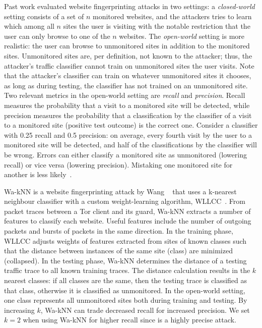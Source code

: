 Past work evaluated website fingerprinting attacks in two settings:
a {\em closed-world} setting consists of a set of $n$ {monitored}
websites, and the attackers tries to learn which among all $n$ sites the
user is visiting with the notable restriction that the user can only
browse to one of the $n$ websites.  The {\em open-world} setting is more
realistic: the user can browse to {unmonitored} sites in addition to the
monitored sites. Unmonitored sites are, per definition, not known to the
attacker; thus, the attacker's traffic classifier cannot train on unmonitored
sites the user visits. Note that the attacker's classifier can train on
whatever unmonitored sites it chooses, as long as during testing, the
classifier has not trained on an unmonitored site. Two relevant metrics
in the open-world
setting are \emph{recall} and \emph{precision}.
Recall measures the probability that
a visit to a monitored site will be detected, while precision measures
the probability that a classification by the classifier of a visit to a
monitored site (positive test outcome) is the correct one. Consider a
classifier with 0.25 recall and 0.5 precision: on average, every fourth
visit by the user to a monitored site will be detected, and half of the
classifications by the classifier will be wrong. Errors can
either classify a monitored site as
unmonitored (lowering recall) or vice versa (lowering precision).
Mistaking one monitored site for another is less likely~\cite{WangThesis}.

Wa-kNN is a website fingerprinting attack by Wang \ea~\cite{Wang2014a}
that uses a k-nearest neighbour classifier with a custom weight-learning
algorithm, WLLCC~\cite{WangThesis}.  From {packet traces}
between a Tor client and its guard, Wa-kNN extracts a number of {features}
to classify each website.  Useful features include
the number of outgoing packets and bursts of packets in the same direction.
In the training phase, WLLCC adjusts {weights} of features extracted from
sites of known classes such that the {distance} between instances of the
same site (class) are minimized (collapsed).
In the testing phase, Wa-kNN determines the distance of a testing traffic trace
to all known training traces.  The distance calculation results in the $k$
nearest classes: if all classes are the same, then the testing trace is
classified as that class, otherwise it is classified as unmonitored.
In the open-world setting, one class represents all unmonitored sites both
during training and testing.  By increasing $k$, Wa-kNN can trade decreased
recall for increased precision.  We set $k=2$ when using Wa-kNN for higher
recall since \name is a highly precise attack.

